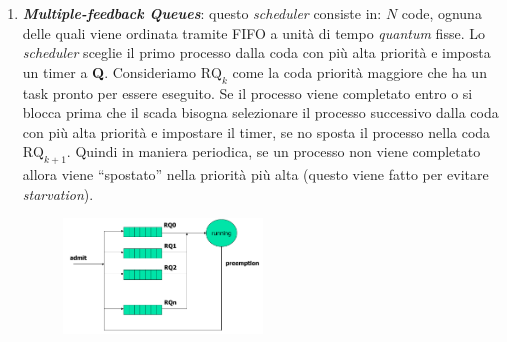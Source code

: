 \begin{enumerate}
    \item \textbf{\textit{Multiple-feedback Queues}}: questo \textit{scheduler} consiste in: $N$ code, ognuna delle quali viene ordinata tramite FIFO a unità di tempo \textit{quantum} fisse. Lo \textit{scheduler} sceglie il primo processo dalla coda con più alta priorità e imposta un timer a \textbf{Q}. Consideriamo $\text{RQ}_k$ come la coda priorità maggiore che ha un task pronto per essere eseguito. Se il processo viene completato entro o si blocca prima che il scada bisogna selezionare il processo successivo dalla coda con più alta priorità e impostare il timer, se no sposta il processo nella coda $\text{RQ}_{k + 1}$. Quindi in maniera periodica, se un processo non viene completato allora viene ``spostato'' nella priorità più alta (questo viene fatto per evitare \textit{starvation}).
    \begin{figure}[h]
        \centering
        \includegraphics[width=0.5\textwidth]{img/mfq}
    \end{figure}
\end{enumerate}